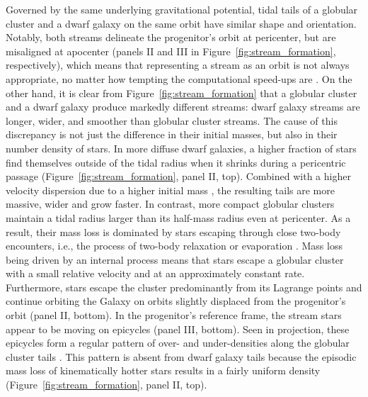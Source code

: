 \documentclass[final,5p,times,twocolumn,authoryear]{elsarticle}
\begin{document}
Governed by the same underlying gravitational potential, tidal tails of a globular cluster and a dwarf galaxy on the same orbit have similar shape and orientation.
Notably, both streams delineate the progenitor's orbit at pericenter, but are misaligned at apocenter (panels II and III in Figure~\ref{fig:stream_formation}, respectively), which means that representing a stream as an orbit is not always appropriate, no matter how tempting the computational speed-ups are \citep{eyre:2009, eyre:2011, sanders:2013a, sanders:2013b}.
On the other hand, it is clear from Figure~\ref{fig:stream_formation} that a globular cluster and a dwarf galaxy produce markedly different streams: dwarf galaxy streams are longer, wider, and smoother than globular cluster streams.
The cause of this discrepancy is not just the difference in their initial masses, but also in their number density of stars.
In more diffuse dwarf galaxies, a higher fraction of stars find themselves outside of the tidal radius when it shrinks during a pericentric passage (Figure~\ref{fig:stream_formation}, panel II, top).
Combined with a higher velocity dispersion due to a higher initial mass \citep[cf.][]{simon:2007, baumgardt:2019}, the resulting tails are more massive, wider and grow faster.
In contrast, more compact globular clusters maintain a tidal radius larger than its half-mass radius even at pericenter.
As a result, their mass loss is dominated by stars escaping through close two-body encounters, i.e., the process of two-body relaxation or evaporation \citep{gnedin:1997,vesperini:1997,baumgardt:2003}.
Mass loss being driven by an internal process means that stars escape a globular cluster with a small relative velocity and at an approximately constant rate.
Furthermore, stars escape the cluster predominantly from its Lagrange points and continue orbiting the Galaxy on orbits slightly displaced from the progenitor's orbit (panel II, bottom).
In the progenitor's reference frame, the stream stars appear to be moving on epicycles (panel III, bottom).
Seen in projection, these epicycles form a regular pattern of over- and under-densities along the globular cluster tails \citep[Figure~\ref{fig:stream_formation}, panel II, bottom;][]{kupper:2008, kupper:2010, just:2009}.
This pattern is absent from dwarf galaxy tails because the episodic mass loss of kinematically hotter stars results in a fairly uniform density (Figure~\ref{fig:stream_formation}, panel II, top).
\end{document}
